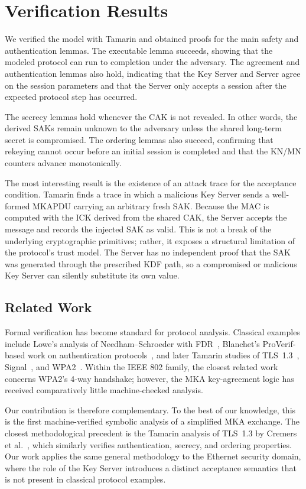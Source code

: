 \section{Verification Results}
\label{sec:results}

We verified the model with Tamarin and obtained proofs for the main safety and authentication lemmas. The executable lemma succeeds, showing that the modeled protocol can run to completion under the adversary. The agreement and authentication lemmas also hold, indicating that the Key Server and Server agree on the session parameters and that the Server only accepts a session after the expected protocol step has occurred.

The secrecy lemmas hold whenever the CAK is not revealed. In other words, the derived SAKs remain unknown to the adversary unless the shared long-term secret is compromised. The ordering lemmas also succeed, confirming that rekeying cannot occur before an initial session is completed and that the KN/MN counters advance monotonically.

The most interesting result is the existence of an attack trace for the acceptance condition. Tamarin finds a trace in which a malicious Key Server sends a well-formed MKAPDU carrying an arbitrary fresh SAK. Because the MAC is computed with the ICK derived from the shared CAK, the Server accepts the message and records the injected SAK as valid. This is not a break of the underlying cryptographic primitives; rather, it exposes a structural limitation of the protocol's trust model. The Server has no independent proof that the SAK was generated through the prescribed KDF path, so a compromised or malicious Key Server can silently substitute its own value.

\subsection{Related Work}
\label{sec:related}

Formal verification has become standard for protocol analysis. Classical examples include Lowe's analysis of Needham--Schroeder with FDR~\cite{lowe1996breaking}, Blanchet's ProVerif-based work on authentication protocols~\cite{blanchet2001efficient}, and later Tamarin studies of TLS~1.3~\cite{cremers2017comprehensive}, Signal~\cite{kobeissi2017automated}, and WPA2~\cite{vanhoef2017key}. Within the IEEE 802 family, the closest related work concerns WPA2's 4-way handshake; however, the MKA key-agreement logic has received comparatively little machine-checked analysis.

Our contribution is therefore complementary. To the best of our knowledge, this is the first machine-verified symbolic analysis of a simplified MKA exchange. The closest methodological precedent is the Tamarin analysis of TLS~1.3 by Cremers et al.~\cite{cremers2017comprehensive}, which similarly verifies authentication, secrecy, and ordering properties. Our work applies the same general methodology to the Ethernet security domain, where the role of the Key Server introduces a distinct acceptance semantics that is not present in classical protocol examples.
